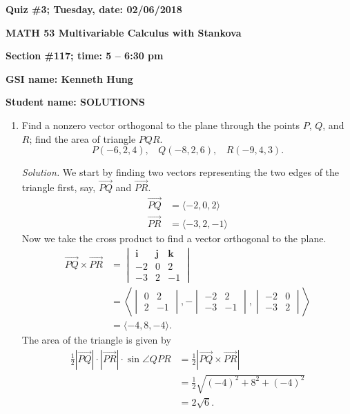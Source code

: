 \documentclass{article}
\begin{document}
{\bf Quiz \#3; Tuesday, date: 02/06/2018}

{\bf MATH 53 Multivariable Calculus with Stankova}

{\bf Section \#117; time: 5 -- 6:30 pm}

{\bf GSI name: Kenneth Hung}

{\bf Student name: SOLUTIONS}

\vspace*{0.25in}

\begin{enumerate}
\item Find a nonzero vector orthogonal to the plane through the points $P$, $Q$, and $R$; find the area of triangle $PQR$.
\[
P(-6, 2, 4), ~~~~ Q(-8, 2, 6), ~~~~ R(-9, 4, 3).
\]

{\em Solution.} We start by finding two vectors representing the two edges of the triangle first, say, $\overrightarrow{PQ}$ and $\overrightarrow{PR}$.
\begin{align*}
\overrightarrow{PQ} & = \langle -2, 0, 2\rangle \\
\overrightarrow{PR} & = \langle -3, 2, -1\rangle
\end{align*}
Now we take the cross product to find a vector orthogonal to the plane.
\begin{align*}
\overrightarrow{PQ} \times \overrightarrow{PR} & = \begin{vmatrix}
\mathbf{i} & \mathbf{j} & \mathbf{k} \\
-2 & 0 & 2 \\
-3 & 2 & -1
\end{vmatrix} \\
& = \left\langle \begin{vmatrix}
0 & 2 \\ 2 & -1
\end{vmatrix}, -\begin{vmatrix}
-2 & 2 \\ -3 & -1
\end{vmatrix}, \begin{vmatrix}
-2 & 0 \\ -3 & 2
\end{vmatrix}\right\rangle \\
& = \langle -4, 8, -4\rangle.
\end{align*}
The area of the triangle is given by
\begin{align*}
\frac{1}{2} |\overrightarrow{PQ}| \cdot |\overrightarrow{PR}| \cdot \sin \angle QPR & = \frac{1}{2} |\overrightarrow{PQ} \times \overrightarrow{PR}| \\
& = \frac{1}{2} \sqrt{(-4)^2 + 8^2 + (-4)^2} \\
& = 2 \sqrt{6}.
\end{align*}


\end{enumerate}
\end{document}
